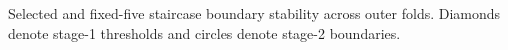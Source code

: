 Selected and fixed-five staircase boundary stability across outer folds. Diamonds denote stage-1 thresholds and circles denote stage-2 boundaries.

